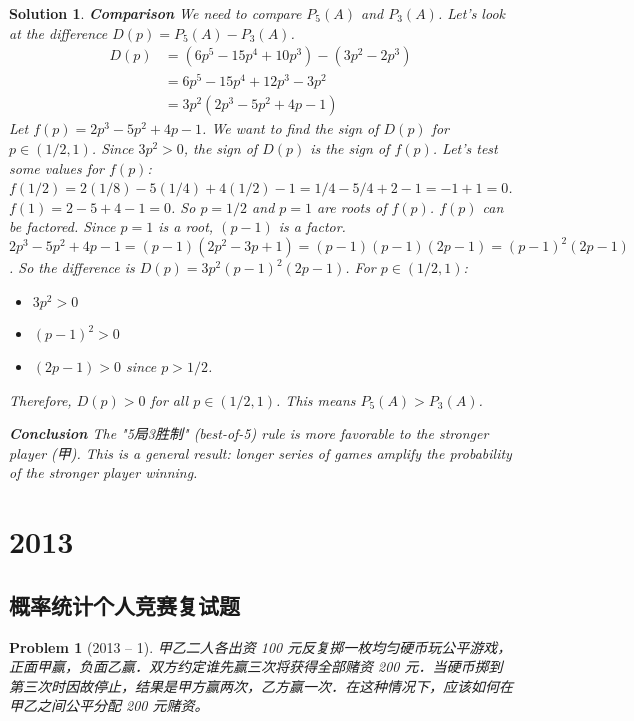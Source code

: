 \documentclass[12pt]{amsart}
\newtheorem{problem}{Problem}
\newtheorem*{solution}{Solution}
\begin{document}
\begin{solution}
\textbf{Comparison}
We need to compare $P_5(A)$ and $P_3(A)$. Let's look at the difference $D(p) = P_5(A) - P_3(A)$.
\begin{align*}
    D(p) &= (6p^5 - 15p^4 + 10p^3) - (3p^2 - 2p^3) \\
    &= 6p^5 - 15p^4 + 12p^3 - 3p^2 \\
    &= 3p^2(2p^3 - 5p^2 + 4p - 1)
\end{align*}
Let $f(p) = 2p^3 - 5p^2 + 4p - 1$. We want to find the sign of $D(p)$ for $p \in (1/2, 1)$.
Since $3p^2 > 0$, the sign of $D(p)$ is the sign of $f(p)$.
Let's test some values for $f(p)$:
$f(1/2) = 2(1/8) - 5(1/4) + 4(1/2) - 1 = 1/4 - 5/4 + 2 - 1 = -1 + 1 = 0$.
$f(1) = 2 - 5 + 4 - 1 = 0$.
So $p=1/2$ and $p=1$ are roots of $f(p)$.
$f(p)$ can be factored. Since $p=1$ is a root, $(p-1)$ is a factor.
$2p^3 - 5p^2 + 4p - 1 = (p-1)(2p^2 - 3p + 1) = (p-1)(p-1)(2p-1) = (p-1)^2(2p-1)$.
So the difference is $D(p) = 3p^2(p-1)^2(2p-1)$.
For $p \in (1/2, 1)$:
\begin{itemize}
    \item $3p^2 > 0$
    \item $(p-1)^2 > 0$
    \item $(2p-1) > 0$ since $p > 1/2$.
\end{itemize}
Therefore, $D(p) > 0$ for all $p \in (1/2, 1)$. This means $P_5(A) > P_3(A)$.

\textbf{Conclusion}
The "5局3胜制" (best-of-5) rule is more favorable to the stronger player (甲). This is a general result: longer series of games amplify the probability of the stronger player winning.
\end{solution}

\section*{2013}
\subsection*{概率统计个人竞赛复试题}
\begin{problem}[2013 -- 1]
甲乙二人各出资 100 元反复掷一枚均匀硬币玩公平游戏，正面甲赢，负面乙赢．双方约定谁先赢三次将获得全部赌资 200 元．当硬币掷到第三次时因故停止，结果是甲方赢两次，乙方赢一次．在这种情况下，应该如何在甲乙之间公平分配 200 元赌资。
\end{problem}
\end{document}
